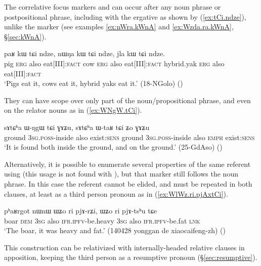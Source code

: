 The correlative focus markers  and  can occur after any noun phrase or postpositional phrase, including with the ergative   as shown by (\ref{ex:tCi.ndze}), unlike the marker  (see examples \ref{ex:nWra.kWnA} and \ref{ex:Wzda.ra.kWnA}, §\ref{sec:kWnA}).
  
  \begin{exe}
\ex \label{ex:tCi.ndze}
 \gll paʁ kɯ tɕi ndze, nɯŋa kɯ tɕi ndze, jla kɯ tɕi ndze.   \\
 pig \textsc{erg} also eat[III]:\textsc{fact}  cow \textsc{erg} also eat[III]:\textsc{fact}  hybrid.yak \textsc{erg} also eat[III]:\textsc{fact}  \\
 \glt `Pigs eat it, cows eat it, hybrid yaks eat it.' (18-NGolo)
()
  \end{exe}

They can have scope over only part of the noun/propositional phrase, and even on the relator nouns as in (\ref{ex:WNgW.tCi}).

   \begin{exe}
\ex \label{ex:WNgW.tCi}
 \gll   sɤtɕʰa ɯ-ŋgɯ tɕi ɣɤʑu, sɤtɕʰa ɯ-taʁ tɕi ʑo ɣɤʑu \\
 ground \textsc{3sg}.\textsc{poss}-inside also exist:\textsc{sens}  ground \textsc{3sg}.\textsc{poss}-inside also \textsc{emph} exist:\textsc{sens} \\
 \glt `It is found both inside the ground, and on the ground.' (25-GdAso)
()
    \end{exe}
    
Alternatively, it is possible to enumerate several properties of the same referent using  (this usage is not found with ), but that marker still follows the noun phrase. In this case the referent cannot be elided, and must be repeated in both clauses, at least as a third person pronoun  as in (\ref{ex:WlWz.ri.pjAxtCi}). 

  \begin{exe}
\ex \label{ex:WlWz.ri.pjArZi}
 \gll pʰaʁrgot nɯnɯ ɯʑo ri pjɤ-rʑi, ɯʑo ri pjɤ-tsʰu tɕe \\
 boar \textsc{dem} \textsc{3sg} also \textsc{ifr}.\textsc{ipfv}-be.heavy \textsc{3sg} also \textsc{ifr}.\textsc{ipfv}-be.fat \textsc{lnk} \\ 
\glt  `The boar, it was heavy and fat.' (140428 yonggan de xiaocaifeng-zh)
()
 \end{exe}

This construction can be relativized with internally-headed relative clauses in apposition, keeping the third person  as a resumptive pronoun (§\ref{sec:resumptive}).

